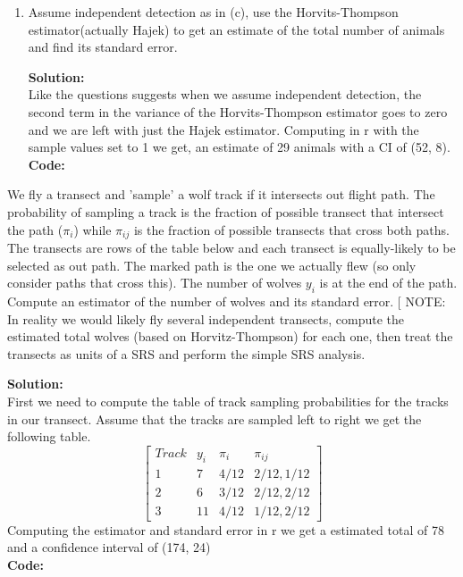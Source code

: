 \documentclass[12pt]{article}
\makeatletter
\theoremstyle{homework}
\newenvironment{exercise}[1]
{\def\@currentlabel{#1}\exercisecore}
{\endexercisecore}
\newcommand{\localhead}[1]{\par\smallskip\noindent\textbf{#1}\nobreak\\}%
\newcommand\solution{\localhead{Solution:}}
\makeatother
\begin{document}
\begin{exercise}{1}
\begin{enumerate}
  
  \item Assume independent detection as in (c), use the Horvits-Thompson estimator(actually Hajek) to get an estimate of the 
  total number of animals and find its standard error. \\
  \solution  Like the questions suggests when we assume independent detection, the second term in the variance of the Horvits-Thompson 
  estimator goes to zero and we are left with just the Hajek estimator. Computing in r with the sample values set to 1 we get, an estimate of 
  29 animals with a CI of (52, 8).\\
  \textbf{Code:}
  \begin{center}
     
  \end{center}
  
\end{enumerate}
\end{exercise}





\begin{exercise}{2} We fly a transect and ’sample’ a wolf track if it intersects out 
  flight path. The probability of sampling a track is the fraction of possible transect 
  that intersect the path ($\pi_i$) while $\pi_{ij}$ is the fraction of possible transects that 
  cross both paths. The transects are rows of the table below and each transect is 
  equally-likely to be selected as out path. The marked path is the one we actually 
  flew (so only consider paths that cross this). The number of wolves $y_i$ is at 
  the end of the path. Compute an estimator of the number of wolves and its standard 
  error. [ NOTE: In reality we would likely fly several independent transects, 
  compute the estimated total wolves (based on Horvitz-Thompson) for each one, 
  then treat the transects as units of a SRS and perform the simple SRS analysis.\\
  \solution First we need to compute the table of track sampling probabilities for the 
  tracks in our transect. Assume that the tracks are sampled left to right we get the following table. 
  \begin{equation*}
    \begin{bmatrix}
      Track & y_i & \pi_i & \pi_{ij}\\
      1 & 7 &  4/12 & 2/12, 1/12\\
      2 & 6 &  3/12 & 2/12, 2/12\\
      3 & 11 & 4/12 & 1/12, 2/12
    \end{bmatrix}
  \end{equation*}
  Computing the estimator and standard error in r we get a estimated total of 78 and a confidence interval of 
  (174, 24)\\
  \textbf{Code:}
  \begin{center}
     
  \end{center}
  
\end{exercise}
\end{document}
